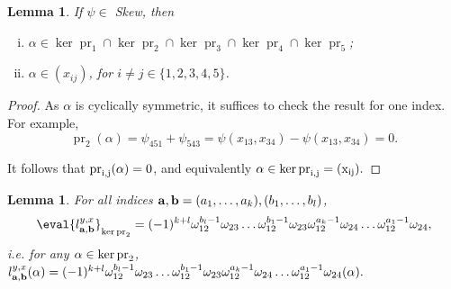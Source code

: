 \documentclass[a4paper,fleqn]{cas-sc}
\newtheorem{lemma}[theorem]{Lemma}
\DeclareMathOperator{\pr}{pr}
\begin{document}
\begin{lemma}\label{lemma:skew}
If $\psi \in$ Skew, then 
\begin{enumerate}[(i)]
\item \label{lemma:skew-i}
    $\alpha\in \ker \pr_1\cap \ker \pr_2\cap\ker \pr_3\cap\ker  \pr_4\cap\ker \pr_5$; 
\item \label{lemma:skew-ii}
    $\alpha\in (x_{ij})$, for $i\ne j \in \{1,2,3,4,5\}$.
\end{enumerate}
\end{lemma}
\begin{proof}
As $\alpha$ is cyclically symmetric, it suffices to check the result for one index. For example,
$$
\pr_2(\alpha)=\psi_{451}+\psi_{543}=\psi(x_{13},x_{34})-\psi(x_{13},x_{34})=0.
$$

It follows that $\rm{pr}_{i,j}(\alpha)=0$, and equivalently $\alpha\in \ker\rm{pr}_{i,j}=(x_{ij}).$
\end{proof}



\begin{lemma}
\label{lemma:l-kerpr2}
For all indices ${\bf{a,b}}=(a_1, \ldots, a_k),(b_1, \ldots, b_l)$,
\begin{equation}
    \label{eq:l-kerpr2}
	\eval{l^{y,x}_{{\bf{a}},{\bf{b}}}}_{\ker \pr_2}=(-1)^{k+l}\omega^{b_l-1}_{12}\omega_{23}\dots \omega_{12}^{b_1-1}\omega_{23}\omega^{a_k-1}_{12}\omega_{24}\dots \omega^{a_1-1}_{12}\omega_{24},
\end{equation}
i.e. for any $\alpha\in \ker \rm{pr}_2$, 
$
l^{y,x}_{\bold a,\bold b}(\alpha)=(-1)^{k+l}\omega^{b_l-1}_{12}\omega_{23}\dots \omega_{12}^{b_1-1}\omega_{23}\omega^{a_k-1}_{12}\omega_{24}\dots \omega^{a_1-1}_{12}\omega_{24}(\alpha).
$
\end{lemma}
\end{document}
